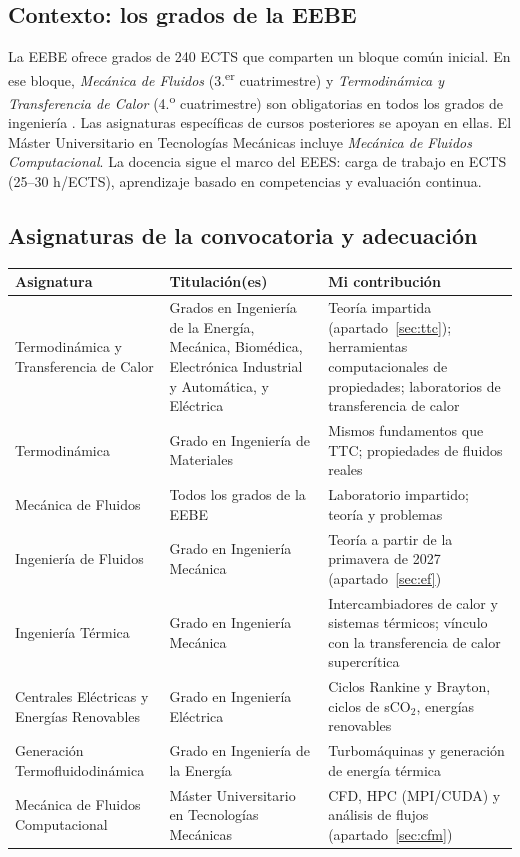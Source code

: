 \documentclass[11pt]{article}
\begin{document}
\subsection{Contexto: los grados de la EEBE}
La EEBE ofrece grados de 240 ECTS que comparten un bloque común inicial. En ese bloque,
\emph{Mecánica de Fluidos} (3.\textsuperscript{er} cuatrimestre) y \emph{Termodinámica y
Transferencia de Calor} (4.\textsuperscript{o} cuatrimestre) son obligatorias en todos los
grados de ingeniería .
Las asignaturas específicas de cursos posteriores se apoyan en ellas. El Máster
Universitario en Tecnologías Mecánicas incluye \emph{Mecánica de Fluidos Computacional}. La
docencia sigue el marco del EEES: carga de trabajo en ECTS (25--30 h/ECTS), aprendizaje
basado en competencias y evaluación continua.

\subsection{Asignaturas de la convocatoria y adecuación}
\begin{center}
\small
\begin{tabularx}{\textwidth}{@{}p{3.9cm}p{3.6cm}X@{}}
\toprule
\textbf{Asignatura} & \textbf{Titulación(es)} & \textbf{Mi contribución} \\
\midrule
Termodinámica y Transferencia de Calor & Grados en Ingeniería de la Energía, Mecánica, Biomédica, Electrónica Industrial y Automática, y Eléctrica & Teoría impartida (apartado~\ref{sec:ttc}); herramientas computacionales de propiedades; laboratorios de transferencia de calor \\
Termodinámica & Grado en Ingeniería de Materiales & Mismos fundamentos que TTC; propiedades de fluidos reales \\
Mecánica de Fluidos & Todos los grados de la EEBE & Laboratorio impartido; teoría y problemas \\
Ingeniería de Fluidos & Grado en Ingeniería Mecánica & Teoría a partir de la primavera de 2027 (apartado~\ref{sec:ef}) \\
Ingeniería Térmica & Grado en Ingeniería Mecánica & Intercambiadores de calor y sistemas térmicos; vínculo con la transferencia de calor supercrítica \\
Centrales Eléctricas y Energías Renovables & Grado en Ingeniería Eléctrica & Ciclos Rankine y Brayton, ciclos de sCO$_2$, energías renovables \\
Generación Termofluidodinámica & Grado en Ingeniería de la Energía & Turbomáquinas y generación de energía térmica \\
Mecánica de Fluidos Computacional & Máster Universitario en Tecnologías Mecánicas & CFD, HPC (MPI/CUDA) y análisis de flujos (apartado~\ref{sec:cfm}) \\
\bottomrule
\end{tabularx}
\end{center}
\end{document}
